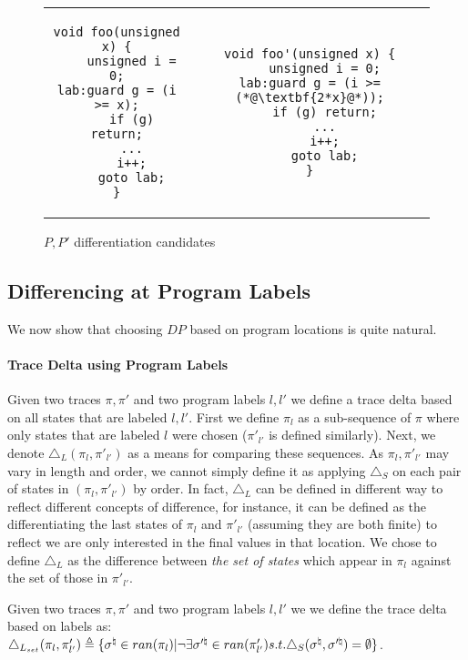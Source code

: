\begin{figure}
\begin{tabular}{cc}
\centering
\begin{lstlisting}
void foo(unsigned x) {
    unsigned i = 0;
lab:guard g = (i >= x);
    if (g) return;
    ...
    i++;
    goto lab;
}
\end{lstlisting}
&
\begin{lstlisting}
void foo'(unsigned x) {
    unsigned i = 0;
lab:guard g = (i >= (*@\textbf{2*x}@*));
    if (g) return;
    ...
    i++;
    goto lab;
}
\end{lstlisting}
\end{tabular}
\caption{$P,P'$ differentiation candidates}
\end{figure}

\subsection{Differencing at Program Labels} 

We now show that choosing $DP$ based on program locations is quite natural.

\paragraph{Trace Delta using Program Labels} 
Given two traces $\pi,\pi'$ and two program labels $l,l'$ we define a trace delta based on all states that are labeled $l,l'$. First we define $\pi_{l}$ as a sub-sequence of $\pi$ where only states that are labeled $l$ were chosen ($\pi'_{l'}$ is defined similarly). Next, we denote $\triangle_L(\pi_{l},\pi'_{l'})$ as a means for comparing these sequences. As $\pi_{l},\pi'_{l'}$ may vary in length and order, we cannot simply define it as applying $\triangle_{S}$ on each pair of states in $(\pi_{l},\pi'_{l'})$ by order. In fact, $\triangle_{L}$ can be defined in different way to reflect different concepts of difference, for instance, it can be defined as the differentiating the last states of $\pi_{l}$ and $\pi'_{l'}$ (assuming they are both finite) to reflect we are only interested in the final values in that location. We chose to define $\triangle_{L}$ as the difference between \emph{the set of states} which appear in $\pi_{l}$ against the set of those in $\pi'_{l'}$. 
\begin{definition}
Given two traces $\pi,\pi'$ and two program labels $l,l'$ we we define the trace delta based on labels as:
$\triangle_{L_{set}}(\pi_{l},\pi'_{l'}) \triangleq \{ \sigma^\natural \in ran(\pi_{l}) | \neg \exists \sigma'^\natural \in ran(\pi'_{l'}) s.t. \triangle_{S}(\sigma^\natural,\sigma'^\natural) = \emptyset \}$.
\end{definition} 

